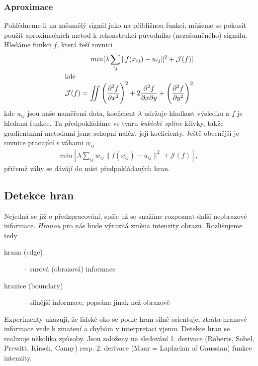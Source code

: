 \subsubsection{Aproximace}
Pohlédneme-li na zašumělý signál jako na přibližnou funkci, můžeme se pokusit použít aproximačních metod k rekonstrukci
původního (nezašuměného) signálu. Hledáme funkci $f$, která řeší rovnici
\begin{align}
min[\lambda \sum\limits_{ij} \|f(x_{ij})-u_{ij}\|^2+\mathcal{J}(f)]\\
\noalign{\hbox{kde}\nonumber}
\mathcal{J}(f)=\int\!\!\!\!\int\left(\frac{\partial^2f}{\partial x^2}\right)^2+2\frac{\partial^2f}{\partial x\partial y}+
\left(\frac{\partial^2f}{\partial y^2}\right)^2
\end{align}
kde $u_{ij}$ jsou naše naměřená data, koeficient $\lambda$ udržuje hladkost výsledku a $f$ je hledaná funkce.
Tu předpokládáme ve tvaru \emph{kubické spline} křivky, takže gradientními metodami jsme schopni nalézt její koeficienty.
Ještě obecnější je rovnice pracující s váhami $w_{ij}$
\begin{align}
min[\lambda \sum\limits_{ij}w_{ij}\|f(x_{ij})-u_{ij}\|^2+\mathcal{J}(f)],
\end{align}
přičemž váhy se dávájí do míst předpokládaných hran.


\subsection{Detekce hran}
Nejedná se již o předzpracování, spíše už se snažíme rozpoznat další neobrazové informace. \emph{Hranou} pro nás bude
výrazná změna intenzity obrazu. Rozlišujeme tedy

\begin{description}
\item[hrana (edge)] -- surová (obrazová) informace
\item[hranice (boundary)] -- silnější informace, popsána jinak než obrazově
\end{description}

Experimenty ukazují, že lidské oko se podle hran silně orientuje, ztráta hranové informace vede k zmatení a chybám v 
interpretaci vjemu. Detekce hran se realizuje několika způsoby. Jsou založeny na sledování 1. derivace (Roberts, Sobel, Prewitt, Kirsch, Canny) resp. 2. derivace (Maar = Laplacian of Gaussian) funkce intenzity.


